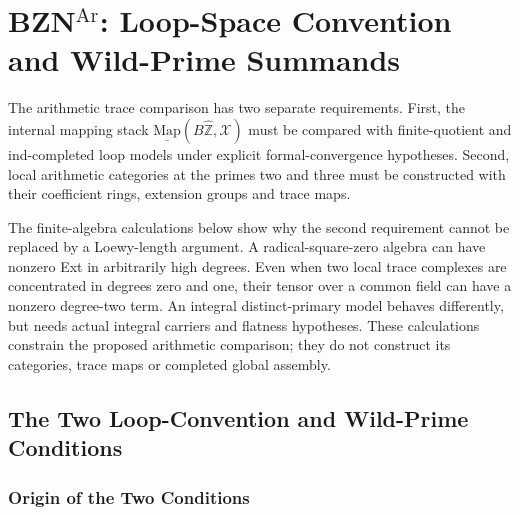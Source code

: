 \chapter{BZN\({}^{\mathrm{Ar}}\): Loop-Space Convention and Wild-Prime Summands}
\label{v4-arith:bzn-rcompletion}

The arithmetic trace comparison has two separate requirements. First,
the internal mapping stack
\(\underline{\mathrm{Map}}(B\widehat{\mathbb Z},\mathcal X)\)
must be compared with finite-quotient and ind-completed loop models
under explicit formal-convergence hypotheses. Second, local arithmetic
categories at the primes two and three must be constructed with their
coefficient rings, extension groups and trace maps.

The finite-algebra calculations below show why the second requirement
cannot be replaced by a Loewy-length argument. A radical-square-zero
algebra can have nonzero Ext in arbitrarily high degrees. Even when
two local trace complexes are concentrated in degrees zero and one,
their tensor over a common field can have a nonzero degree-two term.
An integral distinct-primary model behaves differently, but needs
actual integral carriers and flatness hypotheses. These calculations
constrain the proposed arithmetic comparison; they do not construct
its categories, trace maps or completed global assembly.

\section{The Two Loop-Convention and Wild-Prime Conditions}
\label{v4-arith:bzn-rcompletion:context}

\subsection{Origin of the Two Conditions}

